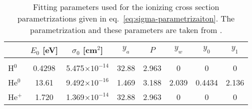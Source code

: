 
\begin{table}
\centering
\begin{tabular}{l | c c c c c c c }
    & $E_0$ [eV]  & $\sigma_0$ [cm$^2$] & $y_a$ & $P$ & $y_w$ & $y_0$ & $y_1$ \\
\hline\\[-0.5em]
H$^0$  & 0.4298 & 5.475$\times 10^{-14}$ & 32.88 & 2.963 & 0     & 0 & 0 \\
He$^0$ & 13.61  & 9.492$\times 10^{-16}$ & 1.469 & 3.188 & 2.039 & 0.4434 & 2.136 \\
He$^+$ & 1.720  & 1.369$\times 10^{-14}$ & 32.88 & 2.963 & 0     & 0 & 0 \\
 \end{tabular}
\caption{Fitting parameters used for the ionizing cross section parametrizations given in 
eq.~\ref{eq:sigma-parametrizaiton}. The parametrization and these parameters are taken from 
\cite{vernerAtomicDataAstrophysics1996}.}
\label{tab:cross-sections}
\end{table}
